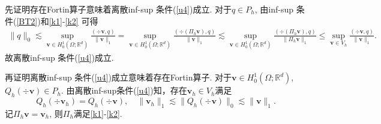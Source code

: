 \begin{prf}
先证明存在Fortin算子意味着离散inf-sup 条件(\ref{u4})成立. 对于$q\in P_h$, 由inf-sup 条件(\ref{BT2})和\eqref{k1}-\eqref{k2} 可得
\begin{align*}
\|q\|_{0}\lesssim\sup _{\boldsymbol{v} \in H_0^{1}(\Omega; \mathbb{R}^{d})}
\frac{(\div\boldsymbol{v}, q)}{\|\boldsymbol{v}\|_{1}}=\sup _{\boldsymbol{v} \in H_0^{1}(\Omega; \mathbb{R}^{d})}
\frac{(\div(\Pi_h\boldsymbol{v}), q)}{\|\boldsymbol{v}\|_{1}}\lesssim\sup _{\boldsymbol{v} \in H_0^{1}(\Omega; \mathbb{R}^{d})}
\frac{(\div(\Pi_h\boldsymbol{v}), q)}{\|\Pi_h\boldsymbol{v}\|_{1}}\leq \sup _{\boldsymbol{v} \in V_h}
\frac{(\div\boldsymbol{v}, q)}{\|\boldsymbol{v}\|_{1}}.
\end{align*}
故离散inf-sup 条件(\ref{u4})成立.

再证明离散inf-sup 条件(\ref{u4})成立意味着存在Fortin算子. 
对于$\boldsymbol{v}\in H_0^{1}(\Omega; \mathbb{R}^{d})$, $Q_h(\div\boldsymbol{v})\in P_h$. 由离散inf-sup条件(\ref{u4})知，存在$\boldsymbol{v}_h\in V_h$满足
\begin{equation*}
Q_h(\div\boldsymbol{v}_h)=Q_h(\div\boldsymbol{v}),\quad \|\boldsymbol{v}_h\|_1\lesssim \|Q_h(\div\boldsymbol{v})\|_0\lesssim \|\boldsymbol{v}\|_1.
\end{equation*}
记$\Pi_{h}\boldsymbol{v}=\boldsymbol{v}_h$, 则$\Pi_{h}$满足\eqref{k1}-\eqref{k2}.
\end{prf}

